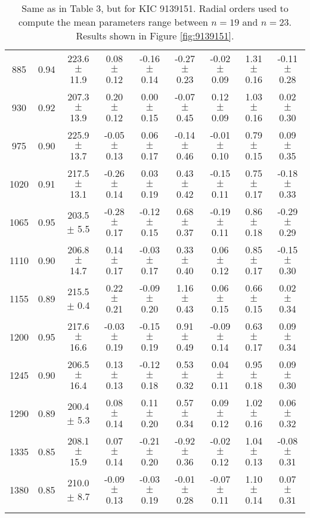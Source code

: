 \documentclass[twocolumn]{aastex61}%
\begin{document}
\begin{table}[ht]
\begin{tabular}{ccc|ccccc|c}
885 & 0.94 & 223.6 $\pm$ 11.9 & 0.08 $\pm$ 0.12 & -0.16 $\pm$ 0.14 & -0.27 $\pm$ 0.23 & -0.02 $\pm$ 0.09 & 1.31 $\pm$ 0.16 & -0.11 $\pm$ 0.28\\
930 & 0.92 & 207.3 $\pm$ 13.9 & 0.20 $\pm$ 0.12 & 0.00 $\pm$ 0.15 & -0.07 $\pm$ 0.45 & 0.12 $\pm$ 0.09 & 1.03 $\pm$ 0.16 & 0.02 $\pm$ 0.30\\
975 & 0.90 & 225.9 $\pm$ 13.7 & -0.05 $\pm$ 0.13 & 0.06 $\pm$ 0.17 & -0.14 $\pm$ 0.46 & -0.01 $\pm$ 0.10 & 0.79 $\pm$ 0.15 & 0.09 $\pm$ 0.35\\
1020 & 0.91 & 217.5 $\pm$ 13.1 & -0.26 $\pm$ 0.14 & 0.03 $\pm$ 0.19 & 0.43 $\pm$ 0.42 & -0.15 $\pm$ 0.11 & 0.75 $\pm$ 0.17 & -0.18 $\pm$ 0.33\\
1065 & 0.95 & 203.5 $\pm$ 5.5 & -0.28 $\pm$ 0.17 & -0.12 $\pm$ 0.15 & 0.68 $\pm$ 0.37 & -0.19 $\pm$ 0.11 & 0.86 $\pm$ 0.18 & -0.29 $\pm$ 0.29\\
1110 & 0.90 & 206.8 $\pm$ 14.7 & 0.14 $\pm$ 0.17 & -0.03 $\pm$ 0.17 & 0.33 $\pm$ 0.40 & 0.06 $\pm$ 0.12 & 0.85 $\pm$ 0.17 & -0.15 $\pm$ 0.30\\
1155 & 0.89 & 215.5 $\pm$ 0.4 & 0.22 $\pm$ 0.21 & -0.09 $\pm$ 0.20 & 1.16 $\pm$ 0.43 & 0.06 $\pm$ 0.15 & 0.66 $\pm$ 0.15 & 0.02 $\pm$ 0.34\\
1200 & 0.95 & 217.6 $\pm$ 16.6 & -0.03 $\pm$ 0.19 & -0.15 $\pm$ 0.19 & 0.91 $\pm$ 0.49 & -0.09 $\pm$ 0.14 & 0.63 $\pm$ 0.17 & 0.09 $\pm$ 0.34\\
1245 & 0.90 & 206.5 $\pm$ 16.4 & 0.13 $\pm$ 0.13 & -0.12 $\pm$ 0.18 & 0.53 $\pm$ 0.32 & 0.04 $\pm$ 0.11 & 0.95 $\pm$ 0.18 & 0.09 $\pm$ 0.30\\
1290 & 0.89 & 200.4 $\pm$ 5.3 & 0.08 $\pm$ 0.14 & 0.11 $\pm$ 0.20 & 0.57 $\pm$ 0.34 & 0.09 $\pm$ 0.12 & 1.02 $\pm$ 0.16 & 0.06 $\pm$ 0.32\\
1335 & 0.85 & 208.1 $\pm$ 15.9 & 0.07 $\pm$ 0.14 & -0.21 $\pm$ 0.20 & -0.92 $\pm$ 0.36 & -0.02 $\pm$ 0.12 & 1.04 $\pm$ 0.13 & -0.08 $\pm$ 0.31\\
1380 & 0.85 & 210.0 $\pm$ 8.7 & -0.09 $\pm$ 0.13 & -0.03 $\pm$ 0.19 & -0.01 $\pm$ 0.28 & -0.07 $\pm$ 0.11 & 1.10 $\pm$ 0.14 & 0.07 $\pm$ 0.31\\\vspace{-0.35cm}
\end{tabular}
\parbox{2\hsize}{\caption{Same as in Table 3, but for KIC 9139151. Radial orders used to compute the mean parameters range between $n=19$ and $n=23$. Results shown in Figure \ref{fig:9139151}.}\label{tab:9139151}}\vspace{-1.5cm}
\end{table}
\end{document}
